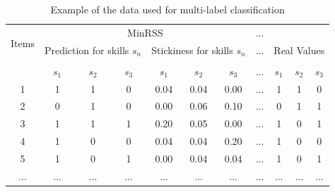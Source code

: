 \documentclass[runningheads,a4paper]{llncs}
\begin{document}


\begin{table}
\centering
	\begin{tabular}{cccc|cccc|ccc}	
\toprule
\multirow{3}{*}{Items} & \multicolumn{6}{c}{MinRSS}&... &\\
\cmidrule{2-7}
& \multicolumn{3}{c|}{Prediction for skills $s_n$} & \multicolumn{3}{c}{Stickiness for skills $s_n$}&...& \multicolumn{3}{c}{Real Values} \\ \\
\cmidrule{2-7}
& $s_1$ & $s_2$ & $s_3$ & $s_1$ & $s_2$ & $s_3$ & ...  & \textbf{$s_1$} & \textbf{$s_2$} & \textbf{$s_3$}\\ \hline

	1 & 1 & 1 & 0 & 0.04 & 0.04 & 0.00 & ...  & 1 & 1 & 0 \\
	2 & 0 & 1 & 0 & 0.00 & 0.06 & 0.10 & ...  & 0 & 1 & 1 \\
	3 & 1 & 1 & 1 & 0.20 & 0.05 & 0.00 & ...  & 1 & 0 & 1\\
	4 & 1 & 0 & 0 & 0.04 & 0.04 & 0.20 & ...  & 1 & 0 & 0 \\
	5 & 1 & 0 & 1 & 0.00 & 0.04 & 0.04 & ...  & 1 & 0 & 1\\
	... &... &... &... &... &... &... &... &... &... &...\\
	 \hline\hline
       
	\end{tabular}

\caption{Example of the data used for multi-label classification} \label{ref:data} 
\end{table}


\end{document}
